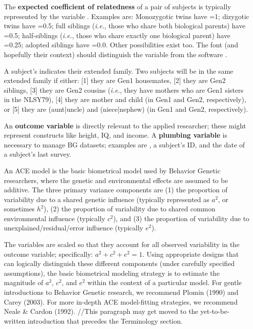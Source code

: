 \documentclass[letterpaper]{article}\usepackage{graphicx, color}
\begin{document}
The \textbf{expected coefficient of relatedness} of a pair of subjects is typically represented by the variable .  Examples are: Monozygotic twins have =1; dizygotic twins have =0.5; full siblings (\emph{i.e.}, those who share both biological parents) have =0.5;  half-siblings (\emph{i.e.}, those who share exactly one biological parent) have =0.25; adopted siblings have =0.0.  Other possibilities exist too.  The font (and hopefully their context) should distinguish the variable  from the software \R{}.

A subject's  indicates their extended family.  Two subjects will be in the same extended family if either: [1] they are Gen1 housemates, [2] they are Gen2 siblings, [3] they are Gen2 cousins (\emph{i.e.}, they have mothers who are Gen1 sisters in the NLSY79), [4] they are mother and child (in Gen1 and Gen2, respectively), or [5] they are (aunt|uncle) and (niece|nephew) (in Gen1 and Gen2, respectively).

An \textbf{outcome variable} is directly relevant to the applied researcher; these might represent constructs like height, IQ, and income.  A \textbf{plumbing variable} is necessary to manage BG datasets; examples are , a subject's ID, and the date of a subject's last survey.

An ACE model is the basic biometrical model used by Behavior Genetic researchers, where the genetic and environmental effects are assumed to be additive. The three primary variance components are (1) the proportion of variability due to a shared genetic influence (typically represented as $a^2$, or sometimes $h^2$), (2) the proportion of variability due to shared common environmental influence (typically $c^2$), and (3) the proportion of variability due to unexplained/residual/error influence (typically $e^2$).  

The variables are scaled so that they account for all observed variability in the outcome variable; specifically: $a^2 + c^2 + e^2 = 1$.  Using appropriate designs that can logically distinguish these different components (under carefully specified assumptions), the basic biometrical modeling strategy is to estimate the magnitude of $a^2$, $c^2$, and $e^2$ within the context of a particular model. For gentle introductions to Behavior Genetic research, we recommend Plomin (1990) and Carey (2003).  For more in-depth ACE model-fitting strategies, we recommend Neale \& Cardon (1992). 
//This paragraph may get moved to the yet-to-be-written introduction that precedes the Terminology section.
\end{document}
